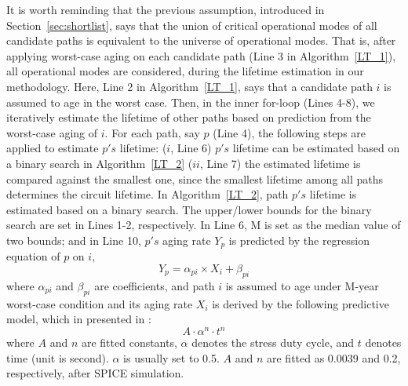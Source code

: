 It is worth reminding that the previous assumption, introduced in Section~\ref{sec:shortlist}, says that the union of critical operational modes of all candidate paths is equivalent to the universe of operational modes. That is, after applying worst-case aging on each candidate path (Line 3 in Algorithm~\ref{LT_1}), all operational modes are considered, during the lifetime estimation in our methodology. Here, Line 2 in Algorithm~\ref{LT_1}, says that a candidate path $i$ is assumed to age in the worst case. Then, in the inner for-loop (Lines 4-8), we iteratively estimate the lifetime of other paths based on prediction from the worst-case aging of $i$. For each path, say $p$ (Line 4), the following steps are applied to estimate $p's$ lifetime: ($i$, Line 6) $p's$ lifetime can be estimated based on a binary search in Algorithm~\ref{LT_2} ($ii$, Line 7) the estimated lifetime is compared against the smallest one, since the smallest lifetime among all paths determines the circuit lifetime.
In Algorithm~\ref{LT_2}, path $p's$ lifetime is estimated based on a binary search. The upper/lower bounds for the binary search are set in Lines 1-2, respectively. In Line 6, M is set as the median value of two bounds; and in Line 10, $p's$ aging rate $Y_{p}$ is predicted by the regression equation of $p$ on $i$, 
\begin{equation*}
	Y_{p} = \alpha_{pi} \times X_{i} + \beta_{pi}
\end{equation*}
where $ \alpha_{pi}$ and $\beta_{pi}$ are coefficients, and path $i$ is assumed to age under M-year worst-case condition and its aging rate $X_{i}$ is derived by the following predictive model, which in presented in \cite{wang2007efficient}:
\begin{equation}
	A \cdot \alpha^n \cdot t^n 
\end{equation}
where $A$ and $n$ are fitted constants, $\alpha$ denotes the stress duty cycle, and $t$ denotes time (unit is second). $\alpha$ is usually set to 0.5. $A$ and $n$ are fitted as 0.0039 and 0.2, respectively, after SPICE simulation.

